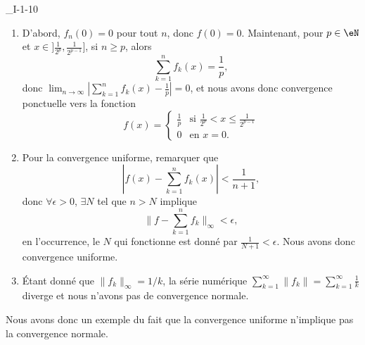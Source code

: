 

\begin{corrige}{_I-1-10}

\begin{enumerate}
\item D'abord, $f_n(0)=0$ pour tout $n$, donc $f(0)=0$. Maintenant, pour $p\in\eN$ et $x\in]\frac{1}{ 2^p },\frac{1}{ 2^{p-1} }]$, si $n\geq p$, alors
\begin{equation}
	\sum_{k=1}^{n}f_k(x)=\frac{1}{ p },
\end{equation}
donc $\lim_{n\to\infty}\left| \sum_{k=1}^n f_k(x)-\frac{1}{ p } \right|=0$, et nous avons donc convergence ponctuelle vers la fonction
\begin{equation}
	f(x)=
\begin{cases}
	\frac{1}{ p }	&	\text{si $\frac{1}{ 2^p }<x\leq \frac{1}{ 2^{p-1} }$}\\
	0	&	 \text{en $x=0$}.
\end{cases}
\end{equation}

\item Pour la convergence uniforme, remarquer que
\begin{equation}
	\left| f(x)-\sum_{k=1}^nf_k(x)\right|<\frac{1}{ n+1 },
\end{equation}
donc $\forall\epsilon > 0$, $\exists N$ tel que $n>N$ implique
\begin{equation}
	\|  f-\sum_{k=1}^nf_k \|_{\infty}<\epsilon,
\end{equation}
en l'occurrence, le $N$ qui fonctionne est donné par $\frac{1}{ N+1 }<\epsilon$. Nous avons donc convergence uniforme.

\item Étant donné que $\| f_k \|_{\infty}=1/k$, la série numérique $\sum_{k=1}^{\infty}\| f_k \|=\sum_{k=1}^{\infty}\frac{1}{ k }$ diverge et nous n'avons pas de convergence normale.
\end{enumerate}

Nous avons donc un exemple du fait que la convergence uniforme n'implique pas la convergence normale.

\end{corrige}
